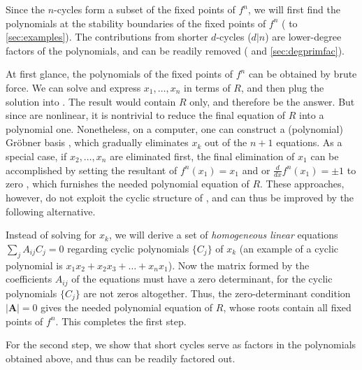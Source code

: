 \documentclass[twocolumn]{revtex4-1}
\begin{document}
Since the $n$-cycles form a subset of the fixed points of $f^n$,
we will first find
  the polynomials at the stability boundaries of
  the fixed points of $f^n$
  ( to \ref{sec:examples}).
The contributions from shorter $d$-cycles ($d|n$)
  are lower-degree factors of the polynomials,
  and can be readily removed
  ( and \ref{sec:degprimfac}).

At first glance, the polynomials of the fixed points of $f^n$
  can be obtained by brute force.
We can solve
   and express $x_1, \ldots, x_n$
  in terms of $R$,
  and then plug the solution into .
The result would contain $R$ only,
  and therefore be the answer.
But since  are nonlinear,
  it is nontrivial to reduce the final equation of $R$
  into a polynomial one.
Nonetheless, on a computer, one can
  construct a (polynomial) Gr\"obner basis \cite{kk1},
  which gradually eliminates $x_k$ out of the $n+1$ equations.
As a special case, if $x_2, \dots, x_n$ are eliminated first,
  the final elimination of $x_1$ can be accomplished
  by setting the resultant of $f^n(x_1) = x_1$ and
   or $\frac{d}{dx}f^n (x_1) = \pm 1$
  to zero \cite{burm},
  which furnishes the needed polynomial equation of $R$.
%
These approaches, however, do not
  exploit the cyclic structure of ,
  and can thus be improved by the following alternative.


Instead of solving  for $x_k$,
  we will derive a set of \emph{homogeneous linear} equations
  $\sum_j A_{ij} C_j = 0$
  regarding cyclic polynomials $\{C_j\}$ of $x_k$
  (an example of a cyclic polynomial is $x_1 x_2 + x_2 x_3 + \dots + x_n x_1$).
%
Now the matrix formed by the coefficients $A_{ij}$ of the equations
  must have a zero determinant,
  for the cyclic polynomials $\{C_j\}$ are not zeros altogether.
%
Thus, the zero-determinant condition $|\mathbf A| = 0$ gives
  the needed polynomial equation of $R$,
whose roots contain all fixed points of $f^n$.
This completes the first step.
%
%


For the second step,
we show
that short cycles serve as
factors in the polynomials obtained above,
and thus can be readily factored out.
\end{document}

